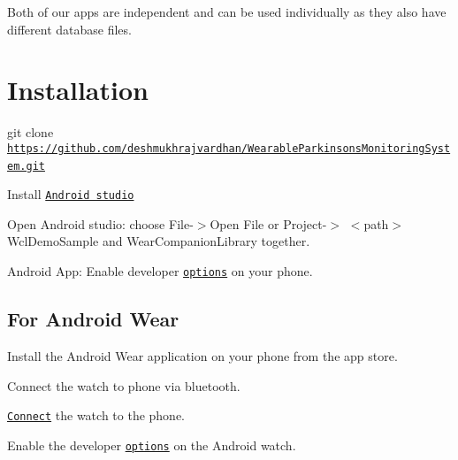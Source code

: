 Both of our apps are independent and can be used individually as they also have different database files. ~\newline


\section*{Installation}


\begin{DoxyEnumerate}
\item {\ttfamily git clone \href{https://github.com/deshmukhrajvardhan/WearableParkinsonsMonitoringSystem.git}{\tt https\+://github.\+com/deshmukhrajvardhan/\+Wearable\+Parkinsons\+Monitoring\+System.\+git}} ~\newline

\item Install \href{https://developer.android.com/studio/index.html}{\tt Android studio} ~\newline

\item Open Android studio\+: choose {\ttfamily File-\/$>$Open File or Project-\/$>$} $<$path$>$ {\ttfamily Wcl\+Demo\+Sample} and {\ttfamily Wear\+Companion\+Library} together. ~\newline

\item Android App\+: Enable developer \href{https://developer.android.com/studio/run/device.html}{\tt options} on your phone. ~\newline

\end{DoxyEnumerate}

\subsection*{For Android Wear}


\begin{DoxyEnumerate}
\item Install the {\ttfamily Android Wear} application on your phone from the app store. ~\newline

\item Connect the watch to phone via bluetooth. ~\newline

\item \href{https://forum.xda-developers.com/moto-360/general/guide-install-apk-moto-360-t3028067}{\tt Connect} the watch to the phone. ~\newline

\item Enable the developer \href{https://forums.androidcentral.com/moto-360/436873-how-enable-developer-options.html}{\tt options} on the Android watch. ~\newline

\end{DoxyEnumerate}

